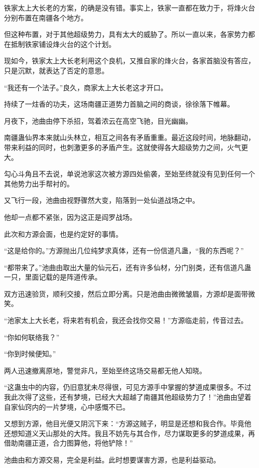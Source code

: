 \begin{this_body}
铁家太上大长老的方案，的确是没有错。事实上，铁家一直都在致力于，将烽火台分别布置在南疆各个地方。

但这种布置，对于其他超级势力，具有太大的威胁了。所以一直以来，各家势力都在抵制铁家铺设烽火台的这个计划。

现如今，铁家太上大长老利用这个良机，又推自家的烽火台，各家首脑没有答应，只是沉默，就表达了否定的意思。

“我还有一个法子。”良久，商家太上大长老这才开口。

持续了一炷香的功夫，这场南疆正道势力首脑之间的商谈，徐徐落下帷幕。

月夜下，池曲由停下杀招，驾着浓云在高空飞驰，目光幽幽。

南疆蛊仙界本来就山头林立，相互之间各有矛盾重重。最近这段时间，地脉翻动，带来利益的同时，也刺激更多的矛盾产生。这就使得各大超级势力之间，火气更大。

勾心斗角且不去说，单说池家这次被方源四处偷袭，至始至终就没有见到任何一个其他势力出手帮衬的。

又飞行一段，池曲由视野骤然大变，陷落到一处仙道战场之中。

他却一点都不紧张，因为这正是阎罗战场。

此次和方源会面，也是约定好的事情。

“这是给你的。”方源抛出几位纯梦求真体，还有一份信道凡蛊，“我的东西呢？”

“都带来了。”池曲由取出大量的仙元石，还有许多仙材，分门别类，还有信道凡蛊一只，里面记载的是阵道传承。

双方迅速验货，顺利交接，然后立即分离。只是池曲由微微皱眉，方源却是面带微笑。

“池家太上大长老，将来若有机会，我还会找你交易！”方源临走前，传音过去。

“你如何联络我？”

“你到时候便知。”

两人迅速撤离原地，警觉非凡，至始至终这场交易都无他人知晓。

“这蛊虫中的内容，仍旧意犹未尽得很，可见方源手中掌握的梦道成果很多。不过我此次得了这些，还有梦境，已经大大超越了南疆其他超级势力了！”池曲由望着自家仙窍内的一片梦境，心中感慨不已。

又想到方源，他目光便又阴沉下来：“方源这贼子，明显是还想和我合作。毕竟他还想知道义天山那处的大阵。我且不妨先与其合作，尽力谋取更多的梦道成果，再借助南疆正道，合力图算他，将他铲除！”

池曲由和方源交易，完全是利益。此时想要谋害方源，也是利益驱动。


\end{this_body}
